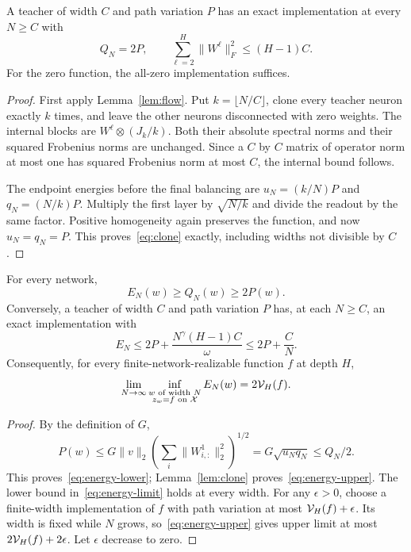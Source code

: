 \begin{lemma}
\label{lem:clone}
A teacher of width $C$ and path variation $P$ has an exact implementation at every $N\ge C$ with
\begin{equation}
 Q_N=2P,\qquad
 \sum_{\ell=2}^H\|W^\ell\|_F^2\le(H-1)C.
 \label{eq:clone}
\end{equation}
For the zero function, the all-zero implementation suffices.
\end{lemma}
\begin{proof}
First apply Lemma~\ref{lem:flow}. Put $k=\lfloor N/C\rfloor$, clone every teacher neuron exactly $k$ times, and leave the other neurons disconnected with zero weights. The internal blocks are $W^\ell\otimes(J_k/k)$. Both their absolute spectral norms and their squared Frobenius norms are unchanged. Since a $C$ by $C$ matrix of operator norm at most one has squared Frobenius norm at most $C$, the internal bound follows.

The endpoint energies before the final balancing are $u_N=(k/N)P$ and $q_N=(N/k)P$. Multiply the first layer by $\sqrt{N/k}$ and divide the readout by the same factor. Positive homogeneity again preserves the function, and now $u_N=q_N=P$. This proves~\eqref{eq:clone} exactly, including widths not divisible by $C$.
\end{proof}

\begin{theorem}
\label{thm:energy-characterization}
For every network,
\begin{equation}
 E_N(w)\ge Q_N(w)\ge2P(w).
 \label{eq:energy-lower}
\end{equation}
Conversely, a teacher of width $C$ and path variation $P$ has, at each $N\ge C$, an exact implementation with
\begin{equation}
 E_N\le2P+\frac{N^\gamma(H-1)C}{\omega}\le2P+\frac CN.
 \label{eq:energy-upper}
\end{equation}
Consequently, for every finite-network-realizable function $f$ at depth $H$,
\begin{equation}
 \lim_{N\to\infty}\inf_{\substack{w\text{ of width }N\\z_w=f\text{ on }\mathcal X}}E_N(w)
 =2\mathcal V_H(f).
 \label{eq:energy-limit}
\end{equation}
\end{theorem}
\begin{proof}
By the definition of $G$,
\[
 P(w)\le G\|v\|_2\left(\sum_i\|W^1_{i,:}\|_2^2\right)^{1/2}
          =G\sqrt{u_Nq_N}\le Q_N/2.
\]
This proves~\eqref{eq:energy-lower}; Lemma~\ref{lem:clone} proves~\eqref{eq:energy-upper}. The lower bound in~\eqref{eq:energy-limit} holds at every width. For any $\epsilon>0$, choose a finite-width implementation of $f$ with path variation at most $\mathcal V_H(f)+\epsilon$. Its width is fixed while $N$ grows, so~\eqref{eq:energy-upper} gives upper limit at most $2\mathcal V_H(f)+2\epsilon$. Let $\epsilon$ decrease to zero.
\end{proof}
